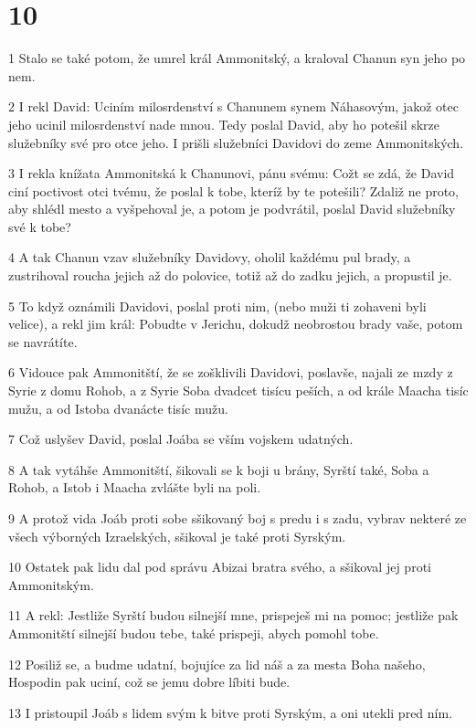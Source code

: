 \chapter{10}

\par 1 Stalo se také potom, že umrel král Ammonitský, a kraloval Chanun syn jeho po nem.
\par 2 I rekl David: Uciním milosrdenství s Chanunem synem Náhasovým, jakož otec jeho ucinil milosrdenství nade mnou. Tedy poslal David, aby ho potešil skrze služebníky své pro otce jeho. I prišli služebníci Davidovi do zeme Ammonitských.
\par 3 I rekla knížata Ammonitská k Chanunovi, pánu svému: Cožt se zdá, že David ciní poctivost otci tvému, že poslal k tobe, kteríž by te potešili? Zdaliž ne proto, aby shlédl mesto a vyšpehoval je, a potom je podvrátil, poslal David služebníky své k tobe?
\par 4 A tak Chanun vzav služebníky Davidovy, oholil každému pul brady, a zustrihoval roucha jejich až do polovice, totiž až do zadku jejich, a propustil je.
\par 5 To když oznámili Davidovi, poslal proti nim, (nebo muži ti zohaveni byli velice), a rekl jim král: Pobudte v Jerichu, dokudž neobrostou brady vaše, potom se navrátíte.
\par 6 Vidouce pak Ammonitští, že se zošklivili Davidovi, poslavše, najali ze mzdy z Syrie z domu Rohob, a z Syrie Soba dvadcet tisícu peších, a od krále Maacha tisíc mužu, a od Istoba dvanácte tisíc mužu.
\par 7 Což uslyšev David, poslal Joába se vším vojskem udatných.
\par 8 A tak vytáhše Ammonitští, šikovali se k boji u brány, Syrští také, Soba a Rohob, a Istob i Maacha zvlášte byli na poli.
\par 9 A protož vida Joáb proti sobe sšikovaný boj s predu i s zadu, vybrav nekteré ze všech výborných Izraelských, sšikoval je také proti Syrským.
\par 10 Ostatek pak lidu dal pod správu Abizai bratra svého, a sšikoval jej proti Ammonitským.
\par 11 A rekl: Jestliže Syrští budou silnejší mne, prispeješ mi na pomoc; jestliže pak Ammonitští silnejší budou tebe, také prispeji, abych pomohl tobe.
\par 12 Posiliž se, a budme udatní, bojujíce za lid náš a za mesta Boha našeho, Hospodin pak uciní, což se jemu dobre líbiti bude.
\par 13 I pristoupil Joáb s lidem svým k bitve proti Syrským, a oni utekli pred ním.

